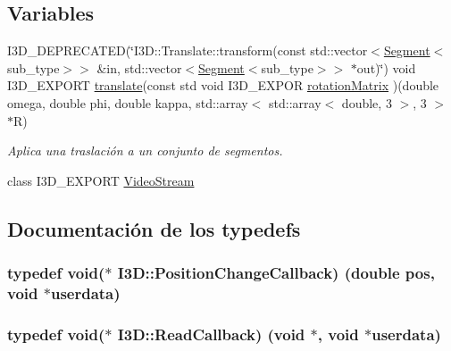 \subsection*{Variables}
\begin{DoxyCompactItemize}
\item 
I3\+D\+\_\+\+D\+E\+P\+R\+E\+C\+A\+T\+ED(\char`\"{}I3\+D\+::\+Translate\+::transform(const std\+::vector$<$\hyperlink{class_i3_d_1_1_segment}{Segment}$<$sub\+\_\+type$>$$>$ \&in, std\+::vector$<$\hyperlink{class_i3_d_1_1_segment}{Segment}$<$sub\+\_\+type$>$$>$ $\ast$out)\char`\"{}) void I3\+D\+\_\+\+E\+X\+P\+O\+RT \hyperlink{namespace_i3_d_af42b0e28a8fa1ad5200480835aec56b2}{translate}(const std void I3\+D\+\_\+\+E\+X\+P\+OR \hyperlink{group__trf_group_ga9fd1816708824e1c55f816cb7663ffc5}{rotation\+Matrix} )(double omega, double phi, double kappa, std\+::array$<$ std\+::array$<$ double, 3 $>$, 3 $>$ $\ast$R)
\begin{DoxyCompactList}\small\item\em Aplica una traslación a un conjunto de segmentos. \end{DoxyCompactList}\item 
class I3\+D\+\_\+\+E\+X\+P\+O\+RT \hyperlink{namespace_i3_d_a58775d79e6c0d424468e795402091a0a}{Video\+Stream}
\end{DoxyCompactItemize}


\subsection{Documentación de los \textquotesingle{}typedefs\textquotesingle{}}
\subsubsection[{\texorpdfstring{Position\+Change\+Callback}{PositionChangeCallback}}]{\setlength{\rightskip}{0pt plus 5cm}typedef void($\ast$ I3\+D\+::\+Position\+Change\+Callback) (double pos, void $\ast$userdata)}\hypertarget{namespace_i3_d_a923a852719565a9e40df22d8cd71281e}{}\label{namespace_i3_d_a923a852719565a9e40df22d8cd71281e}
\subsubsection[{\texorpdfstring{Read\+Callback}{ReadCallback}}]{\setlength{\rightskip}{0pt plus 5cm}typedef void($\ast$ I3\+D\+::\+Read\+Callback) (void $\ast$, void $\ast$userdata)}\hypertarget{namespace_i3_d_a7005f50d43ac0b10e2f50ab09994f45b}{}\label{namespace_i3_d_a7005f50d43ac0b10e2f50ab09994f45b}
